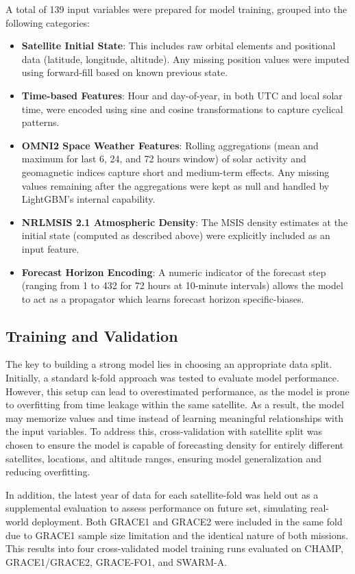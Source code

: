 \documentclass[11pt,a4paper]{storm-ai_report}
\begin{document}
A total of 139 input variables were prepared for model training, grouped into the following categories:

\begin{itemize}
    \item \textbf{Satellite Initial State}: This includes raw orbital elements and positional data (latitude, longitude, altitude). Any missing position values were imputed using forward-fill based on known previous state.
    \item \textbf{Time-based Features}: Hour and day-of-year, in both UTC and local solar time, were encoded using sine and cosine transformations to capture cyclical patterns.
    \item \textbf{OMNI2 Space Weather Features}: Rolling aggregations (mean and maximum for last 6, 24, and 72 hours window) of solar activity and geomagnetic indices capture short and medium-term effects. Any missing values remaining after the aggregations were kept as null and handled by LightGBM's internal capability.
    \item \textbf{NRLMSIS 2.1 Atmospheric Density}: The MSIS density estimates at the initial state (computed as described above) were explicitly included as an input feature.
    \item \textbf{Forecast Horizon Encoding}: A numeric indicator of the forecast step (ranging from 1 to 432 for 72 hours at 10-minute intervals) allows the model to act as a propagator which learns forecast horizon specific-biases.
\end{itemize}

\subsection{Training and Validation}

The key to building a strong model lies in choosing an appropriate data split. Initially, a standard k-fold approach was tested to evaluate model performance. However, this setup can lead to overestimated performance, as the model is prone to overfitting from time leakage within the same satellite. As a result, the model may memorize values and time instead of learning meaningful relationships with the input variables. To address this, cross-validation with satellite split was chosen to ensure the model is capable of forecasting density for entirely different satellites, locations, and altitude ranges, ensuring model generalization and reducing overfitting.

In addition, the latest year of data for each satellite-fold was held out as a supplemental evaluation to assess performance on future set, simulating real-world deployment. Both GRACE1 and GRACE2 were included in the same fold due to GRACE1 sample size limitation and the identical nature of both missions. This results into four cross-validated model training runs evaluated on CHAMP, GRACE1/GRACE2, GRACE-FO1, and SWARM-A.
\end{document}

